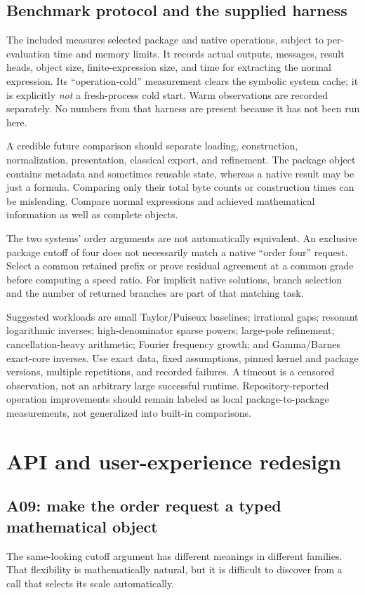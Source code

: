 \documentclass[11pt,a4paper]{article}
\newcommand{\code}[1]{\texttt{\detokenize{#1}}}
\begin{document}
\subsection{Benchmark protocol and the supplied harness}
The included \code{CompareBuiltins.wls} measures selected package and native
operations, subject to per-evaluation time and memory limits. It records
actual outputs, messages, result heads, object size, finite-expression size,
and time for extracting the normal expression. Its ``operation-cold''
measurement clears the symbolic system cache; it is explicitly \emph{not}
a fresh-process cold start. Warm observations are recorded separately.
No numbers from that harness are present because it has not been run here.

A credible future comparison should separate loading, construction,
normalization, presentation, classical export, and refinement. The package
object contains metadata and sometimes reusable state, whereas a native
result may be just a formula. Comparing only their total byte counts or
construction times can be misleading. Compare normal expressions and
achieved mathematical information as well as complete objects.

The two systems' order arguments are not automatically equivalent. An
exclusive package cutoff of four does not necessarily match a native
``order four'' request. Select a common retained prefix or prove residual
agreement at a common grade before computing a speed ratio. For implicit
native solutions, branch selection and the number of returned branches are
part of that matching task.

Suggested workloads are small Taylor/Puiseux baselines; irrational gaps;
resonant logarithmic inverses; high-denominator sparse powers; large-pole
refinement; cancellation-heavy arithmetic; Fourier frequency growth; and
Gamma/Barnes exact-core inverses. Use exact data, fixed assumptions, pinned
kernel and package versions, multiple repetitions, and recorded failures.
A timeout is a censored observation, not an arbitrary large successful
runtime. Repository-reported operation improvements should remain labeled
as local package-to-package measurements, not generalized into built-in
comparisons.
\cite{validation}

\section{API and user-experience redesign}
\label{sec:ux}
\subsection{A09: make the order request a typed mathematical object}
The same-looking cutoff argument has different meanings in different
families. That flexibility is mathematically natural, but it is difficult
to discover from a call that selects its scale automatically.
\cite{core,special,gamma,readme}
\end{document}

